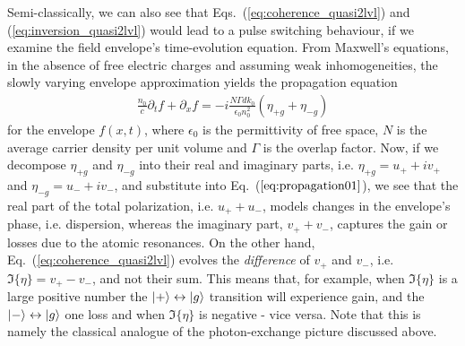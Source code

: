 \documentclass[reprint,secnumarabic,amssymb, nobibnotes, aip, prd]{revtex4-1}
\def\p{\partial}
\newcommand{\vspacec}{\vspace{-0.3cm}}
\begin{document}
\vspacec
Semi-classically, we can also see that Eqs.~(\ref{eq:coherence_quasi2lvl}) and (\ref{eq:inversion_quasi2lvl}) would lead to a pulse switching behaviour, if we examine the field envelope's time-evolution equation. From Maxwell's equations, in the absence of free electric charges and assuming weak inhomogeneities, the slowly varying envelope approximation yields the propagation equation \cite{jirauschek2014modeling}
\begin{align}
\label{eq:propagation01}
\frac{n_0}{c} \p_t f + \p_x f = -i\frac{N \Gamma d k_0}{\epsilon_0 n_0^2}(\eta_{+g}+\eta_{-g})
\end{align}
for the envelope $f(x,t)$, where $\epsilon_0$ is the permittivity of free space, $N$ is the average carrier density per unit volume and $\Gamma$ is the overlap factor. Now, if we decompose $\eta_{+g}$ and $\eta_{-g}$ into their real and imaginary parts, i.e. $\eta_{+g} = u_{+}+iv_{+}$ and $\eta_{-g} = u_{-}+iv_{-}$, and substitute into Eq.~($\ref{eq:propagation01}$), we see that the real part of the total polarization, i.e. $u_++u_-$, models changes in the envelope's phase, i.e. dispersion, whereas the imaginary part, $v_++v_-$, captures the gain or losses due to the atomic resonances. On the other hand, Eq.~(\ref{eq:coherence_quasi2lvl}) evolves the \emph{difference} of $v_+$ and $v_-$, i.e. $\Im\{\eta\}=v_+-v_-$, and not their sum. This means that, for example, when $\Im\{\eta\}$ is a large  positive number the $\ket{+}\leftrightarrow \ket{g}$ transition will experience gain, and the $\ket{-}\leftrightarrow\ket{g}$ one loss and when $\Im\{\eta\}$ is negative - vice versa. Note that this is namely the classical analogue of the photon-exchange picture discussed above.


\end{document}
